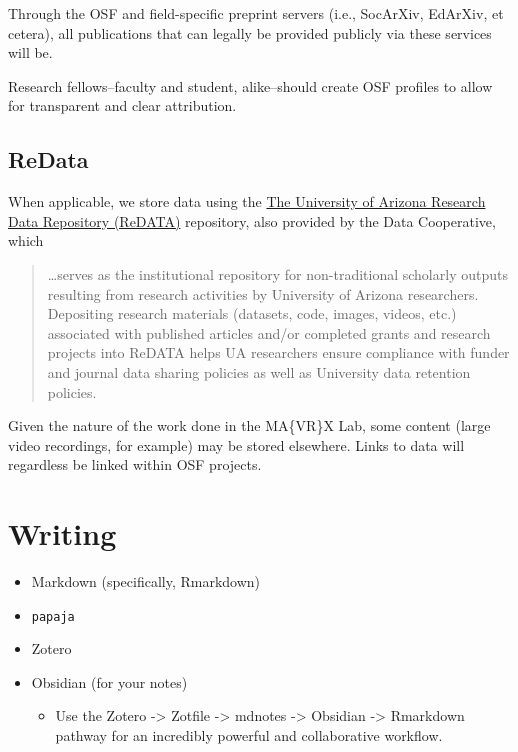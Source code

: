 \documentclass[]{tufte-book}
\providecommand{\tightlist}{%
  \setlength{\itemsep}{0pt}\setlength{\parskip}{0pt}}
\begin{document}
Through the OSF and field-specific preprint servers (i.e., SocArXiv, EdArXiv, et cetera), all publications that can legally be provided publicly via these services will be.

Research fellows--faculty and student, alike--should create OSF profiles to allow for transparent and clear attribution.

\hypertarget{redata}{%
\subsection{ReData}\label{redata}}

When applicable, we store data using the \href{https://data.library.arizona.edu/data-management/services/research-data-repository-redata}{The University of Arizona Research Data Repository (ReDATA)} repository, also provided by the Data Cooperative, which

\begin{quote}
\ldots serves as the institutional repository for non-traditional scholarly outputs resulting from research activities by University of Arizona researchers. Depositing research materials (datasets, code, images, videos, etc.) associated with published articles and/or completed grants and research projects into ReDATA helps UA researchers ensure compliance with funder and journal data sharing policies as well as University data retention policies.
\end{quote}

Given the nature of the work done in the MA\{VR\}X Lab, some content (large video recordings, for example) may be stored elsewhere. Links to data will regardless be linked within OSF projects.

\hypertarget{writing}{%
\section{Writing}\label{writing}}

\begin{itemize}
\tightlist
\item
  Markdown (specifically, Rmarkdown)
\item
  \texttt{papaja}
\item
  Zotero
\item
  Obsidian (for your notes)

  \begin{itemize}
  \tightlist
  \item
    Use the Zotero -\textgreater{} Zotfile -\textgreater{} mdnotes -\textgreater{} Obsidian -\textgreater{} Rmarkdown pathway for an incredibly powerful and collaborative workflow.
  \end{itemize}
\end{itemize}
\end{document}
